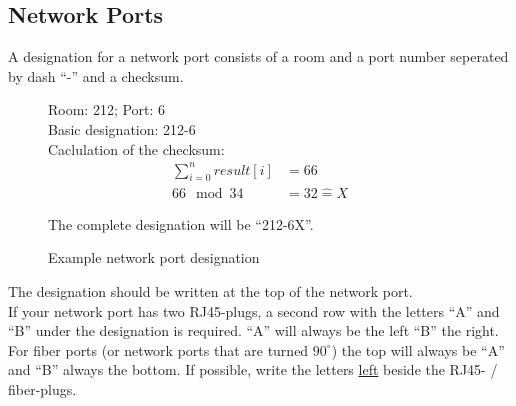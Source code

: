 %
%
%
%
%
%
%

\subsection{Network Ports}

A designation for a network port consists of a room and a port number seperated
by dash ``-'' and a checksum.

\begin{figure}[H]
	Room: 212; Port: 6 \\
	Basic designation: 212-6 \\

	Caclulation of the checksum:
	\begin{align*}
		\sum_{i=0}^{n} result[i] &= 66 \\
		66 \mod 34 &= 32 \hat{=} X
	\end{align*}

	The complete designation will be ``212-6X''.

	\caption{Example network port designation}
\end{figure}

The designation should be written at the top of the network port. \\


If your network port has two RJ45-plugs, a second row with the letters ``A'' and
``B'' under the designation is required. ``A'' will always be the left ``B'' the
right.
For fiber ports (or network ports that are turned $90^{\circ}$) the top will
always be ``A'' and ``B'' always the bottom. If possible, write the letters
\underline{left} beside the RJ45- / fiber-plugs.

